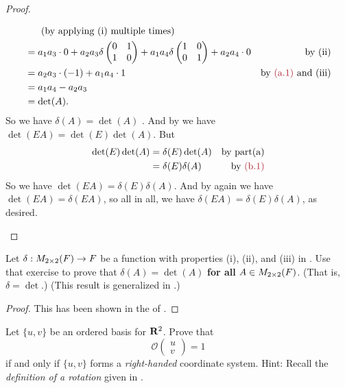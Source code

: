 \begin{proof}
\begin{enumerate}
\begin{align*}
              & \text{\ \ \ \ \  (by applying (i) multiple times)} \\
              & = a_1 a_3 \cdot 0
                + a_2 a_3 \delta \begin{pmatrix} 0 & 1 \\ 1 & 0 \end{pmatrix}
                + a_1 a_4 \delta \begin{pmatrix} 1 & 0 \\ 0 & 1 \end{pmatrix}
                + a_2 a_4 \cdot 0 & \text{by (ii)} \\
              & = a_2 a_3 \cdot (-1) + a_1 a_4 \cdot 1 & \text{by \MAROON{(a.1)} and (iii)} \\
              & = a_1 a_4 - a_2 a_3 \\
              & = \det(A).
\end{align*}
So we have \(\delta(A) = \det(A)\) .
And by  we have \(\det(EA) = \det(E)\det(A)\).
But
\begin{align*}
    \det(E)\det(A) & = \delta(E)\det(A) & \text{by part(a)} \\
                   & = \delta(E)\delta(A) &  \text{by \MAROON{(b.1)}}
\end{align*}
So we have \(\det(EA) = \delta(E)\delta(A)\).
And by  again we have \(\det(EA) = \delta(EA)\), so all in all, we have \(\delta(EA) = \delta(E)\delta(A)\), as desired.
\end{enumerate}
\end{proof}

\begin{exercise} \label{exercise 4.1.12}
Let \(\delta: M_{2 \times 2}(F) \to F\) be a function with properties (i), (ii), and (iii) in .
Use that exercise to prove that \(\delta(A) = \det(A)\) \textbf{for all} \(A \in M_{2 \times 2}(F)\).
(That is, \(\delta = \det\).)
(This result is generalized in .)
\end{exercise}

\begin{proof}
This has been shown in the  of .
\end{proof}

\begin{exercise} \label{exercise 4.1.13}
Let \(\{ u, v \}\) be an ordered basis for \(\mathbf{R}^2\).
Prove that
\[
    \mathcal{O} \begin{pmatrix} u \\ v \end{pmatrix} = 1
\]
if and only if \(\{ u, v \}\) forms a \emph{right-handed} coordinate system.
Hint: Recall the \emph{definition of a rotation} given in .
\end{exercise}

